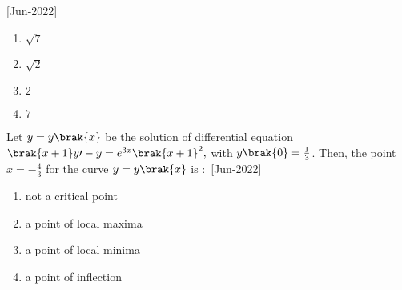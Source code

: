     \hfill{[Jun-2022]}
        \begin{enumerate}
            \item $\sqrt{7}$
            \item  $\sqrt{2}$
            \item $2$
            \item $7$
        \end{enumerate}
    \item Let $y=y\brak{x}$ be the solution of differential equation $\brak{x+1}y\prime-y=e^{3x}\brak{x+1}^2,$ with $y\brak{0}=\frac{1}{3}$. Then, the point $x=-\frac{4}{3}$ for the curve $y=y\brak{x}$ is $\colon$
    \hfill{[Jun-2022]}
        \begin{enumerate}
            \item not a critical point
            \item a point of local maxima
            \item a point of local minima
            \item a point of inflection
        \end{enumerate} 
